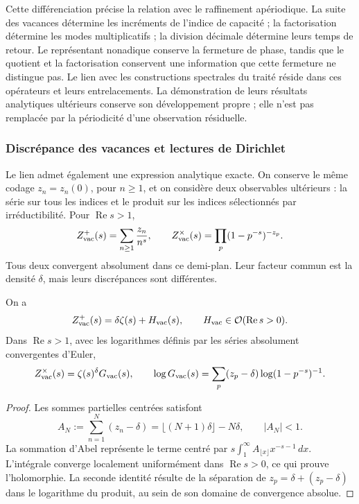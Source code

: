 Cette différenciation précise la relation avec le raffinement apériodique.
La suite des vacances détermine les incréments de l'indice de
capacité ; la factorisation détermine les modes multiplicatifs ; la
division décimale détermine leurs temps de retour. Le représentant
nonadique conserve la fermeture de phase, tandis que le quotient et la
factorisation conservent une information que cette fermeture ne distingue pas. Le
lien avec les constructions spectrales du traité réside dans ces
opérateurs et leurs entrelacements. La démonstration de leurs résultats
analytiques ultérieurs conserve son développement propre ; elle n'est pas remplacée par
la périodicité d'une observation résiduelle.

\subsubsection{Discrépance des vacances et lectures de Dirichlet}

Le lien admet également une expression analytique exacte. On conserve le
même codage \(z_n=z_n(0)\), pour \(n\geq1\), et on considère
deux observables ultérieurs : la série sur tous les indices et le
produit sur les indices sélectionnés par irréductibilité. Pour
\(\operatorname{Re}s>1\),
\[
 Z_{\rm vac}^{+}(s)=\sum_{n\geq1}\frac{z_n}{n^s},\qquad
 Z_{\rm vac}^{\times}(s)=\prod_p(1-p^{-s})^{-z_p}.
\]
Tous deux convergent absolument dans ce demi-plan. Leur facteur commun est la
densité \(\delta\), mais leurs discrépances sont différentes.

\begin{proposition}
On a
\[
 Z_{\rm vac}^{+}(s)=\delta\zeta(s)+H_{\rm vac}(s),
 \qquad H_{\rm vac}\in\mathcal O(\operatorname{Re}s>0).
\]
Dans \(\operatorname{Re}s>1\), avec les logarithmes définis par les séries absolument convergentes d'Euler,
\[
 Z_{\rm vac}^{\times}(s)=\zeta(s)^\delta G_{\rm vac}(s),\qquad
 \log G_{\rm vac}(s)=
 \sum_p(z_p-\delta)\log(1-p^{-s})^{-1}.
\]
\end{proposition}
\begin{proof}
Les sommes partielles centrées satisfont
\[
 A_N:=\sum_{n=1}^N(z_n-\delta)
 =\lfloor(N+1)\delta\rfloor-N\delta,\qquad |A_N|<1.
\]
La sommation d'Abel représente le terme centré par \(s\int_1^\infty A_{\lfloor x\rfloor}x^{-s-1}\,dx\). L'intégrale converge localement uniformément dans \(\operatorname{Re}s>0\), ce qui prouve l'holomorphie. La seconde identité résulte de la séparation de \(z_p=\delta+(z_p-\delta)\) dans le logarithme du produit, au sein de son domaine de convergence absolue.
\end{proof}

